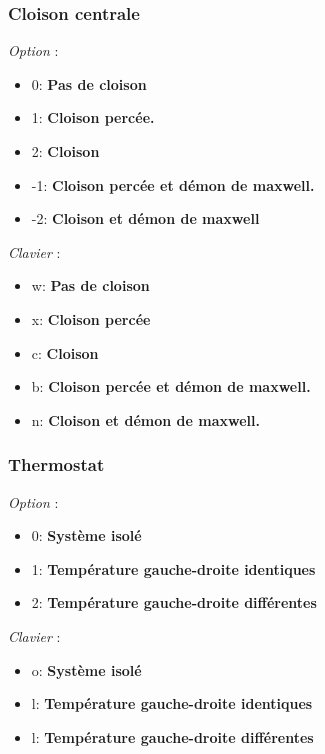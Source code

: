 \subsubsection{Cloison centrale}

	{\it Option} : 

\begin{itemize}[leftmargin=1cm, label=, itemsep=0pt]
\item 0: {\bf Pas de cloison}
\item 1: {\bf Cloison percée.}
\item 2: {\bf Cloison}
\item -1: {\bf Cloison percée et démon de maxwell.}
\item -2: {\bf Cloison et démon de maxwell}
\end{itemize}

	{\it Clavier} : 

\begin{itemize}[leftmargin=1cm, label=, itemsep=0pt]
\item w: {\bf Pas de cloison}
\item x: {\bf Cloison percée}
\item c: {\bf Cloison}
\item b: {\bf Cloison percée et démon de maxwell.}
\item n: {\bf Cloison et démon de maxwell.}
\end{itemize}

\subsubsection{Thermostat}

	{\it Option} : 

\begin{itemize}[leftmargin=1cm, label=, itemsep=0pt]
\item 0: {\bf Système isolé}
\item 1: {\bf Température gauche-droite identiques}
\item 2: {\bf Température gauche-droite différentes}
\end{itemize}

	{\it Clavier} : 

\begin{itemize}[leftmargin=1cm, label=, itemsep=0pt]
\item o: {\bf Système isolé}
\item l: {\bf Température gauche-droite identiques}
\item l: {\bf Température gauche-droite différentes}
\end{itemize}

